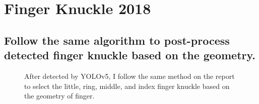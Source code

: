 \section{Finger Knuckle 2018}
\subsection{Follow the same algorithm to post-process detected finger knuckle based on the geometry.}


\begin{figure}[ht!]
    \centering


    \caption{After detected by YOLOv5, I follow the same method on the report to select the little, ring, middle, and index finger knuckle based on the geometry of finger.}
    \label{select-algorithm}
\end{figure}





